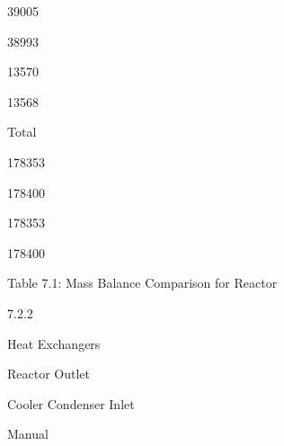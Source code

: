 \documentclass[a4paper,portrait,12pt]{article}
\begin{document}
39005





38993





13570





13568





\begin{flushleft}
Total
\end{flushleft}





178353





178400





178353





178400





\begin{flushleft}
Table 7.1: Mass Balance Comparison for Reactor
\end{flushleft}





7.2.2





\begin{flushleft}
Heat Exchangers
\end{flushleft}


\begin{flushleft}
Reactor Outlet
\end{flushleft}





\begin{flushleft}
Cooler Condenser Inlet
\end{flushleft}





\begin{flushleft}
Manual
\end{flushleft}
\end{document}
